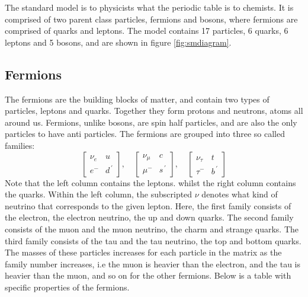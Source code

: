 The standard model is to physicists what the periodic table is to chemists. It is comprised of two parent class particles, fermions and bosons, where fermions 
are comprised of quarks and leptons. The model contains 17 particles, 6 quarks, 6 leptons and 5 bosons, and are shown in figure \ref{fig:smdiagram}.



\subsection*{Fermions}
The fermions are the building blocks of matter, and contain two types of particles, leptons and quarks. Together they form protons and neutrons,  atoms all around us.
Fermions, unlike bosons, are spin half particles, and are also the only particles to have anti particles. The fermions are grouped into three so called families:
\begin{equation*}
    \begin{bmatrix}
        \nu_e & u \\
        e^{-} & d^{\, '} 
    \end{bmatrix},\quad
    \begin{bmatrix}
        \nu_{\mu} & c \\
        \mu^{-} & s^{\, '}
    \end{bmatrix},\quad
    \begin{bmatrix}
        \nu_{\tau} & t \\
        \tau^{-} & b^{\, '}
    \end{bmatrix}
\end{equation*}
Note that the left column contains the leptons. whilst the right column contains the quarks. Within the left column, the subscripted $\nu$ denotes what kind of neutrino that corresponds 
to the given lepton. Here, the first family consists of the electron, the electron neutrino, the up and down quarks. The second family consists of the muon and the
muon neutrino, the charm and strange quarks. The third family consists of the tau and the tau neutrino, the top and bottom quarks. The masses of these particles 
increases for each particle in the matrix as the family number increases, i.e the muon is heavier than the electron, and the tau is heavier than the muon, and so 
on for the other fermions. Below is a table with specific properties of the fermions.\par

